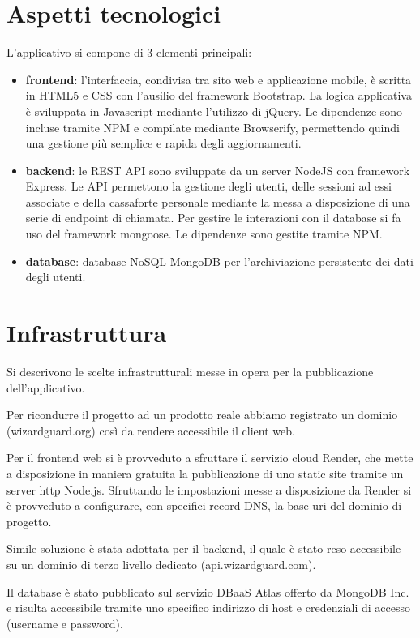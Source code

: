 \documentclass[a4paper]{report}
\begin{document}
\section{Aspetti tecnologici}
L'applicativo si compone di 3 elementi principali:
\begin{itemize}
    \item \textbf{frontend}: l'interfaccia, condivisa tra sito web e applicazione mobile, è scritta in HTML5 e CSS con l'ausilio del framework Bootstrap\cite{bootstrap}. La logica applicativa è sviluppata in Javascript mediante l'utilizzo di jQuery\cite{jquery}. Le dipendenze sono incluse tramite NPM\cite{npm} e compilate mediante Browserify\cite{browserify}, permettendo quindi una gestione più semplice e rapida degli aggiornamenti.
    \item \textbf{backend}: le REST API sono sviluppate da un server NodeJS\cite{nodejs} con framework Express\cite{express}. Le API permettono la gestione degli utenti, delle sessioni ad essi associate e della cassaforte personale mediante la messa a disposizione di una serie di endpoint di chiamata. Per gestire le interazioni con il database si fa uso del framework mongoose\cite{mongoose}. Le dipendenze sono gestite tramite NPM.
    \item \textbf{database}: database NoSQL MongoDB\cite{mongo} per l'archiviazione persistente dei dati degli utenti.
\end{itemize}
\section{Infrastruttura}
Si descrivono le scelte infrastrutturali messe in opera per la pubblicazione dell'applicativo.

Per ricondurre il progetto ad un prodotto reale abbiamo registrato un dominio (wizardguard.org) così da rendere accessibile il client web.

Per il frontend web si è provveduto a sfruttare il servizio cloud Render\cite{render}, che mette a disposizione in maniera gratuita la pubblicazione di uno static site tramite un server http Node.js. Sfruttando le impostazioni messe a disposizione da Render si è provveduto a configurare, con specifici record DNS, la base uri del dominio di progetto.

Simile soluzione è stata adottata per il backend, il quale è stato reso accessibile su un dominio di terzo livello dedicato (api.wizardguard.com).

Il database è stato pubblicato sul servizio DBaaS Atlas offerto da MongoDB Inc. e risulta accessibile tramite uno specifico indirizzo di host e credenziali di accesso (username e password).
\end{document}
